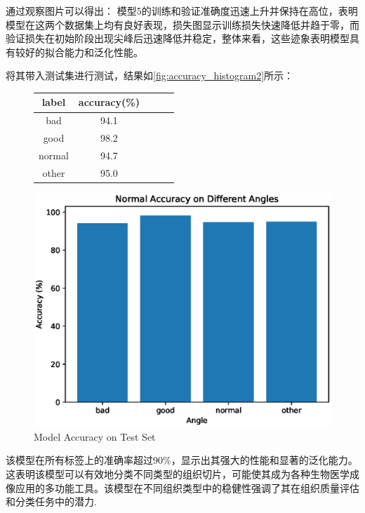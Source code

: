 通过观察图片可以得出：
模型5的训练和验证准确度迅速上升并保持在高位，表明模型在这两个数据集上均有良好表现，损失图显示训练损失快速降低并趋于零，而验证损失在初始阶段出现尖峰后迅速降低并稳定，整体来看，这些迹象表明模型具有较好的拟合能力和泛化性能。

将其带入测试集进行测试，结果如\autoref{fig:accuracy_histogram2}所示：

\begin{figure}[H]
    \begin{minipage}{0.45\textwidth}
        \centering
        \begin{tabular}{ccccc}
            \toprule
            label & accuracy(\%) \\
            \midrule
            bad & 94.1 \\
            good & 98.2 \\
            normal & 94.7 \\
            other & 95.0 \\
            \bottomrule
        \end{tabular}
        \label{tab:model_accuracy3}
    \end{minipage}
    \begin{minipage}{0.45\textwidth}
        \centering
        \includegraphics[width=\textwidth]{./fig/assistplot/angle_accuracy2.eps}
        \caption{Model Accuracy on Test Set}
        \label{fig:accuracy_histogram2}
    \end{minipage}
\end{figure}

该模型在所有标签上的准确率超过90\%，显示出其强大的性能和显著的泛化能力。这表明该模型可以有效地分类不同类型的组织切片，可能使其成为各种生物医学成像应用的多功能工具。该模型在不同组织类型中的稳健性强调了其在组织质量评估和分类任务中的潜力.



\FloatBarrier